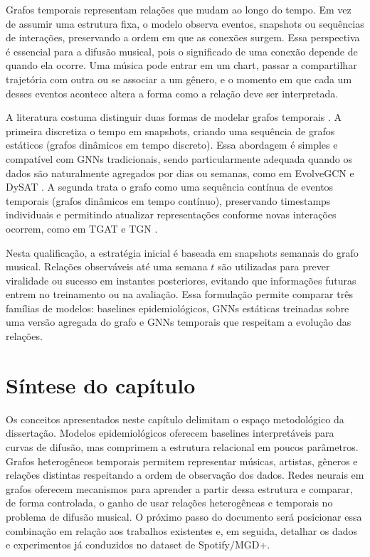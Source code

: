 Grafos temporais representam relações que mudam ao longo do tempo. Em vez de assumir uma estrutura fixa, o modelo observa eventos, snapshots ou sequências de interações, preservando a ordem em que as conexões surgem. Essa perspectiva é essencial para a difusão musical, pois o significado de uma conexão depende de quando ela ocorre. Uma música pode entrar em um chart, passar a compartilhar trajetória com outra ou se associar a um gênero, e o momento em que cada um desses eventos acontece altera a forma como a relação deve ser interpretada.

A literatura costuma distinguir duas formas de modelar grafos temporais \citep{kazemi2020dynamicsurvey}. A primeira discretiza o tempo em snapshots, criando uma sequência de grafos estáticos (grafos dinâmicos em tempo discreto). Essa abordagem é simples e compatível com GNNs tradicionais, sendo particularmente adequada quando os dados são naturalmente agregados por dias ou semanas, como em EvolveGCN e DySAT \citep{pareja2020evolvegcn,sankar2020dysat}. A segunda trata o grafo como uma sequência contínua de eventos temporais (grafos dinâmicos em tempo contínuo), preservando timestamps individuais e permitindo atualizar representações conforme novas interações ocorrem, como em TGAT e TGN \citep{xu2020tgat,rossi2020tgn}.

Nesta qualificação, a estratégia inicial é baseada em snapshots semanais do grafo musical. Relações observáveis até uma semana $t$ são utilizadas para prever viralidade ou sucesso em instantes posteriores, evitando que informações futuras entrem no treinamento ou na avaliação. Essa formulação permite comparar três famílias de modelos: baselines epidemiológicos, GNNs estáticas treinadas sobre uma versão agregada do grafo e GNNs temporais que respeitam a evolução das relações.


\section{Síntese do capítulo}

Os conceitos apresentados neste capítulo delimitam o espaço metodológico da dissertação. Modelos epidemiológicos oferecem baselines interpretáveis para curvas de difusão, mas comprimem a estrutura relacional em poucos parâmetros. Grafos heterogêneos temporais permitem representar músicas, artistas, gêneros e relações distintas respeitando a ordem de observação dos dados. Redes neurais em grafos oferecem mecanismos para aprender a partir dessa estrutura e comparar, de forma controlada, o ganho de usar relações heterogêneas e temporais no problema de difusão musical. O próximo passo do documento será posicionar essa combinação em relação aos trabalhos existentes e, em seguida, detalhar os dados e experimentos já conduzidos no dataset de Spotify/MGD+.
